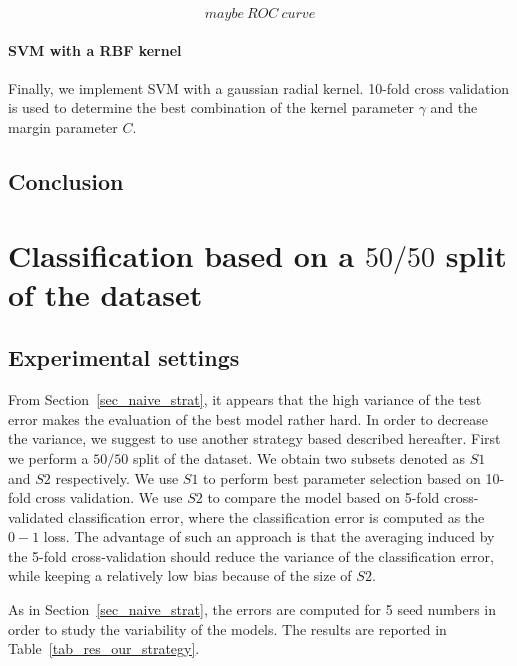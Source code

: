 $$ maybe~ROC~curve$$

\paragraph{SVM with a RBF kernel}
Finally, we implement SVM with a gaussian radial kernel. \num{10}-fold cross validation is used to determine the best combination of the kernel parameter $ \gamma $ and the margin parameter $C$. 

\subsection{Conclusion}

\section{Classification based on a $50/50$ split of the dataset}
\label{sec_our_strat}
\subsection{Experimental settings}
From Section~\ref{sec_naive_strat}, it appears that the high variance of the test error makes the evaluation of the best model rather hard.
In order to decrease the variance, we suggest to use another strategy based described hereafter. 
First we perform a $50/50$ split of the dataset. We obtain two subsets denoted as $S1$ and $S2$ respectively.
We use $S1$ to perform best parameter selection based on \num{10}-fold cross validation.
We use $S2$ to compare the model based on \num{5}-fold cross-validated classification error, where the classification error is computed as the $0-1$ loss. 
The advantage of such an approach is that the averaging induced by the \num{5}-fold cross-validation should reduce the variance of the classification error, while keeping a relatively low bias because of the size of $S2$. 

As in Section~\ref{sec_naive_strat}, the errors are computed for \num{5} seed numbers in order to study the variability of the models.
The results are reported in Table~\ref{tab_res_our_strategy}.

